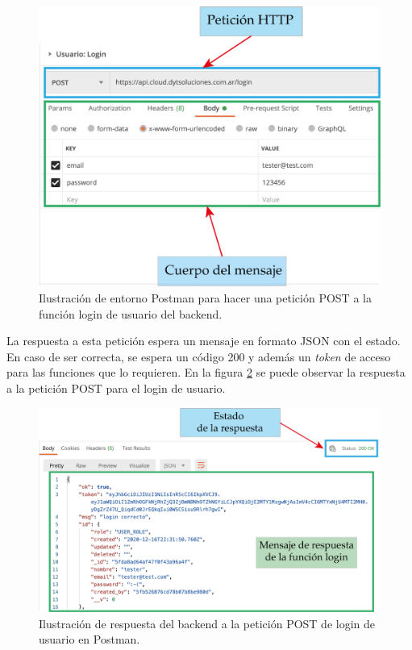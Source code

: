 \begin{figure}[htpb]
	\centering
	\includegraphics[scale=1.1]{./Figures/postman-login.png}
	\caption[Petición HTTP a función de login de usuarios en Postman]{Ilustración de entorno Postman para hacer una petición POST a la función login de usuario del backend.}
	\label{fig:postman-login}
\end{figure}

\pagebreak
La respuesta a esta petición espera un mensaje en formato JSON con el estado. En caso de ser correcta, se espera un código 200 y además un \textit{token} de acceso para las funciones que lo requieren.  En la figura \ref{fig:login-response} se puede observar la respuesta a la petición POST para el login de usuario.

\begin{figure}[htpb]
	\centering
	\includegraphics[scale=0.90]{./Figures/login-response.png}
	\caption[Respuesta a petición de login desde Postman]{Ilustración de respuesta del backend a la petición POST de login de usuario en Postman.}
	\label{fig:login-response}
\end{figure}

